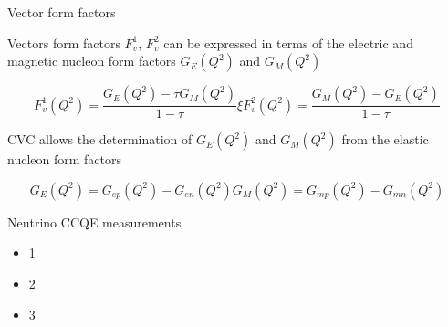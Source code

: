 %
%

\begin{frame}{Vector form factors}

Vectors form factors $F_{v}^{1}$, $F_{v}^{2}$ can be expressed in terms of the electric and
magnetic nucleon form factors $G_{E}(Q^2)$ and $G_{M}(Q^{2})$

\begin{equation*}
     F_{v}^{1}(Q^2) = \frac {G_{E}(Q^2) - \tau G_{M}(Q^2)} {1-\tau}
 \xi F_{v}^{2}(Q^2) = \frac {G_{M}(Q^2) -      G_{E}(Q^2)} {1-\tau}
\end{equation*}

CVC allows the determination of $G_{E}(Q^2)$ and $G_{M}(Q^{2})$ from the elastic nucleon form factors

\begin{equation*}
   G_{E}(Q^2) =  G_{ep}(Q^2) -  G_{en}(Q^2)
   G_{M}(Q^2) =  G_{mp}(Q^2) -  G_{mn}(Q^2)
\end{equation*}

\end{frame}

%
%

\begin{frame}{Neutrino CCQE measurements}

\begin{itemize}
\item 1
\item 2
\item 3
\end{itemize}

\end{frame}


%
%

